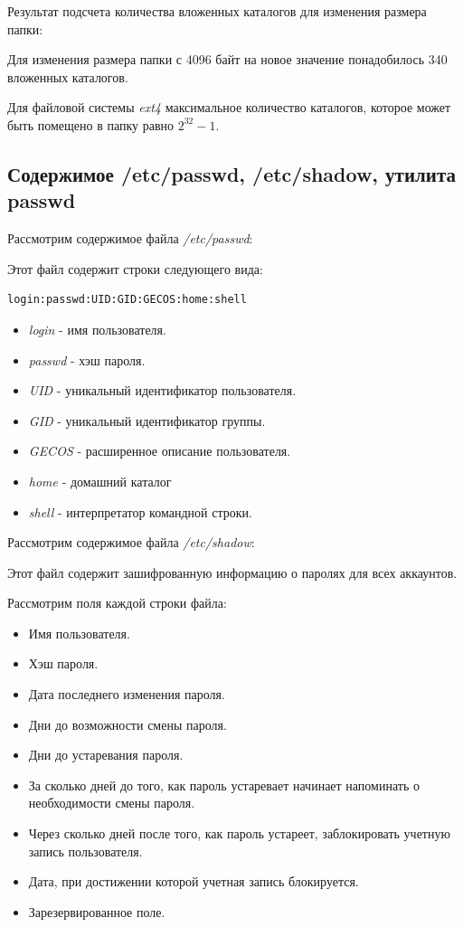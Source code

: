 \documentclass[14pt,a4paper,report]{report}
\begin{document}


Результат подсчета количества вложенных каталогов для изменения размера папки:



Для изменения размера папки с 4096 байт на новое значение понадобилось 340 вложенных каталогов.

Для файловой системы \emph{ext4} максимальное количество каталогов, которое может быть помещено в папку равно $2^{32}-1$.

\subsection{Содержимое /etc/passwd, /etc/shadow, утилита passwd}

Рассмотрим содержимое файла \emph{/etc/passwd}:



Этот файл содержит строки следующего вида:

\begin{verbatim}
login:passwd:UID:GID:GECOS:home:shell
\end{verbatim}

\begin{itemize}
	\item \emph{login} - имя пользователя.
	\item \emph{passwd} - хэш пароля.
	\item \emph{UID} - уникальный идентификатор пользователя.
	\item \emph{GID} - уникальный идентификатор группы.
	\item \emph{GECOS} - расширенное описание пользователя.
	\item \emph{home} - домашний каталог
	\item \emph{shell} - интерпретатор командной строки.
\end{itemize}

Рассмотрим содержимое файла \emph{/etc/shadow}:



Этот файл содержит зашифрованную информацию о паролях для всех аккаунтов.

Рассмотрим поля каждой строки файла:

\begin{itemize}
	\item Имя пользователя.
	\item Хэш пароля.
	\item Дата последнего изменения пароля.
	\item Дни до возможности смены пароля.
	\item Дни до устаревания пароля.
	\item За сколько дней до того, как пароль устаревает начинает напоминать о необходимости смены пароля.
	\item Через сколько дней после того, как пароль устареет, заблокировать учетную запись пользователя.
	\item Дата, при достижении которой учетная запись блокируется.
	\item Зарезервированное поле.
\end{itemize}
\end{document}
